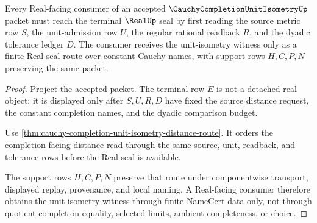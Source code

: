 \begin{theorem}
\label{thm:cauchy-completion-unit-isometry-real-seal}
Every Real-facing consumer of an accepted $\CauchyCompletionUnitIsometryUp$
packet must reach the terminal $\RealUp$ seal by first reading the source
metric row $S$, the unit-admission row $U$, the regular rational readback $R$,
and the dyadic tolerance ledger $D$. The consumer receives the unit-isometry
witness only as a finite Real-seal route over constant Cauchy names, with
support rows $H,C,P,N$ preserving the same packet.
\end{theorem}
\begin{proof}
Project the accepted packet. The terminal row $E$ is not a detached real
object; it is displayed only after $S,U,R,D$ have fixed the source distance
request, the constant completion names, and the dyadic comparison budget.

Use \autoref{thm:cauchy-completion-unit-isometry-distance-route}. It orders
the completion-facing distance read through the same source, unit, readback,
and tolerance rows before the Real seal is available.

The support rows $H,C,P,N$ preserve that route under componentwise transport,
displayed replay, provenance, and local naming. A Real-facing consumer
therefore obtains the unit-isometry witness through finite NameCert data only,
not through quotient completion equality, selected limits, ambient
completeness, or choice.
\end{proof}




